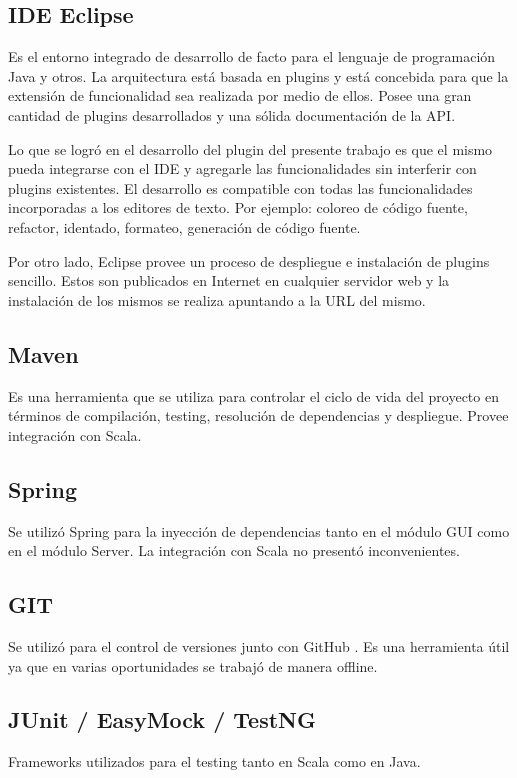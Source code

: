 \documentclass[12pt,a4paper]{article}
\begin{document}
\subsection{IDE Eclipse}
Es el entorno integrado de desarrollo de facto para el lenguaje de programación Java y otros. La arquitectura está
basada en plugins y está concebida para que la extensión de funcionalidad sea realizada por medio de ellos. 
Posee una gran cantidad  de plugins desarrollados y una sólida documentación de la API.

Lo que se logró en el desarrollo del plugin del presente trabajo es que el mismo pueda integrarse con el IDE
y agregarle las funcionalidades sin interferir con plugins existentes. El desarrollo es compatible
con todas las funcionalidades incorporadas a los editores de texto. Por ejemplo: coloreo de código fuente, refactor,
identado, formateo, generación de código fuente.

Por otro lado, Eclipse provee un proceso de despliegue e instalación de plugins sencillo. Estos son publicados 
en Internet en cualquier servidor web y la instalación de los mismos se realiza apuntando a la URL del mismo.

\subsection{Maven}
Es una herramienta que se utiliza para controlar el ciclo de vida del proyecto en términos de compilación, testing,
resolución de dependencias y despliegue. Provee integración con Scala.

\subsection{Spring}
Se utilizó Spring para la inyección de dependencias tanto en el módulo GUI como en el módulo Server. La integración
con Scala no presentó inconvenientes.

\subsection{GIT}
Se utilizó para el control de versiones junto con GitHub \cite{github}. Es una herramienta útil ya que en varias
oportunidades se trabajó de manera offline.

\subsection{JUnit\cite{junit} / EasyMock\cite{easymock} / TestNG\cite{testng} }
Frameworks utilizados para el testing tanto en Scala como en Java.
\end{document}
